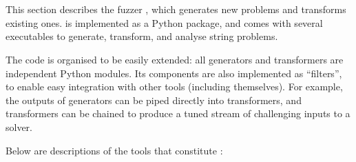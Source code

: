 \section{\fuzzer{}}
\label{sec:fuzzer}

    This section describes the fuzzer \fuzzer{}, which generates new \smtfull{} problems and transforms existing ones. \fuzzer{} is implemented as a Python package, and comes with several executables to generate, transform, and analyse \smtfull{} string problems.


    The \fuzzer{} code is organised to be easily extended: all generators and transformers are independent Python modules. Its components are also implemented as \unix{} ``filters'', to enable easy integration with other tools (including themselves). For example, the outputs of generators can be piped directly into transformers, and transformers can be chained to produce a tuned stream of challenging inputs to a solver.

    Below are descriptions of the tools that constitute \fuzzer{}:

